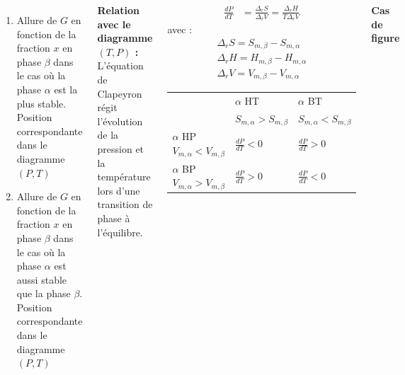 \documentclass[12pt, a3paper, portrait]{tikzposter}
\begin{document}
\begin{columns}
{\begin{enumerate}
\item Allure de $G$ en fonction de la fraction $x$ en phase $\beta$ dans le cas où la phase $\alpha$ est la plus stable. Position correspondante dans le diagramme $(P,T)$

\item Allure de $G$ en fonction de la fraction $x$ en phase $\beta$ dans le cas où la phase $\alpha$ est aussi stable que la phase $\beta$. Position correspondante dans le diagramme $(P,T)$
\end{enumerate}


\textbf{Relation avec le diagramme $(T,P)$ :} L'équation de Clapeyron régit l'évolution de la pression et la température lors d'une transition de phase à l'équilibre.
\begin{center}
\begin{minipage}[c]{0.3\colwidth}
\begin{align*}
\frac{dP}{dT} &= \frac{\Delta_r S}{\Delta_r V} = \frac{\Delta_r H}{T \Delta_r V}
\end{align*}
avec :
\begin{align*}
\Delta _r S = S_{m,\beta} - S_{m,\alpha} \\
\Delta _r H = H_{m,\beta} - H_{m,\alpha} \\
\Delta _r V = V_{m,\beta} - V_{m,\alpha}
\end{align*}
\end{minipage}\begin{minipage}[c]{0.3\colwidth}%
\begin{tabular}{|C{5cm}|C{5cm}C{5cm}|}
\hline
& $\alpha$ HT & $\alpha$ BT \\
& $S_{m, \alpha} > S_{m, \beta}$ & $S_{m, \alpha} < S_{m, \beta}$ \\
\hline
$\alpha$ HP $V_{m, \alpha} < V_{m, \beta}$ & $\frac{dP}{dT} < 0$ & $\frac{dP}{dT} > 0$  \\
$\alpha$ BP $V_{m, \alpha} > V_{m, \beta}$  & $\frac{dP}{dT} > 0$  & $\frac{dP}{dT} < 0$ \\
\hline
\end{tabular}
\end{minipage}\end{center}

\textbf{Cas de figure}

}
\end{columns}
\end{document}

